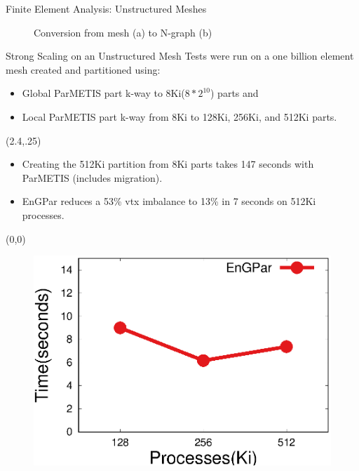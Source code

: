 \documentclass{beamer}
\begin{document}
\begin{textblock}{15.6}
\begin{textblock}{5.1}
\begin{block}{\centering Finite Element Analysis: Unstructured Meshes}
\begin{textblock}{2.5}
\begin{figure}
        \caption{Conversion from mesh (a) to N-graph (b)}
      \end{figure}
      \end{textblock}
      \vspace{20cm}
    \end{block}
    \begin{block}{\centering Strong Scaling on an Unstructured Mesh}
      Tests were run on a one billion element mesh created and partitioned using:
      \begin{itemize}
      \item Global ParMETIS part k-way to 8Ki($8*2^{10}$) parts and
      \item Local ParMETIS part k-way from 8Ki to 128Ki, 256Ki, and 512Ki parts.
      \end{itemize}
      \begin{textblock}{2.5}(2.4,.25)
        \begin {itemize}
        \item Creating the 512Ki partition from 8Ki parts takes 147 seconds with ParMETIS (includes migration). 
        \item EnGPar reduces a 53\% vtx imbalance to 13\% in 7 seconds on 512Ki processes. 
        \end{itemize}
      \end{textblock}
      \begin{textblock}{2.5}(0,0)
      \begin{figure}
        \centering
        \includegraphics[width=.9\textwidth]{../plots/mira_fem_results/time_v_cores.eps}
      \end{figure}
      \end{textblock}
      \vspace{11.5cm}
      

\end{block}
\end{textblock}
\end{textblock}
\end{document}
